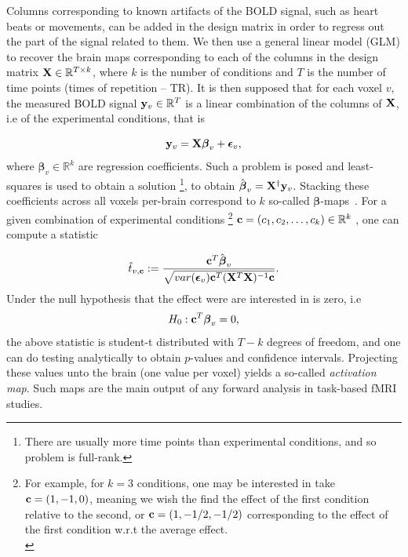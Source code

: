 Columns corresponding to known artifacts of the BOLD signal, such as heart
beats or movements, can be added in the design matrix in order to regress out
the part of the signal related to them. We then use a general linear model (GLM) to
recover the brain maps corresponding to each of the columns in the design
matrix $\mathbf{X} \in \mathbb R^{T \times k}$, where $k$ is the number of conditions and $T$ is the number of time points (times of repetition -- TR).  It is then supposed that for each voxel $v$, the measured BOLD signal $\mathbf{y}_v \in \mathbb R^T$ is a linear combination of the columns of $\mathbf{X}$, i.e of the experimental conditions, that is

\begin{equation}
  \mathbf{y}_v = \mathbf{X}\boldsymbol{\beta}_v + \boldsymbol{\epsilon}_v,
\end{equation}
where $\boldsymbol{\beta}_v \in \mathbb R^k$ are regression coefficients.
Such a problem is posed and least-squares is used to obtain a solution
\footnote{There are usually more time points than experimental conditions, and so problem is full-rank.},
to obtain $\hat{\boldsymbol{\beta}}_v = \mathbf{X}^\dagger\mathbf{y}_v$.  Stacking these coefficients across all voxels per-brain correspond to $k$ so-called $\boldsymbol{\beta}$-maps~\citep{friston1994statistical}. For a given combination of experimental conditions \footnote{For example, for $k = 3$ conditions, one may be interested in take $\mathbf{c} = (1, -1, 0)$, meaning we wish the find the effect of the first condition relative to the second, or $\mathbf{c}=(1,-1/2,-1/2)$ corresponding to the effect of the first condition w.r.t the average effect.\\}
$\mathbf{c}  = (c_1,c_2,\ldots,c_k)\in \mathbb R^k$ , one can compute a statistic

\begin{equation}
\hat{t}_{v,\mathbf{c}} := \frac{\mathbf{c}^T\hat{\boldsymbol{\beta}}_v}{\sqrt{var(\boldsymbol{\epsilon}_v)\mathbf{c}^T(\mathbf{X}^T\mathbf{X})^{-1}\mathbf{c}}}.
\end{equation}
Under the null hypothesis that the effect were are interested in is zero, i.e
\begin{equation}
  H_0: \mathbf{c}^T\boldsymbol{\beta}_v = 0,
\end{equation}
the above statistic is student-t distributed with $T-k$ degrees of freedom, and one can do testing analytically to obtain $p$-values and confidence intervals. Projecting these values unto the brain (one value per voxel) yields a so-called \textit{activation map}. Such maps are the main output of any forward analysis in task-based fMRI studies.

